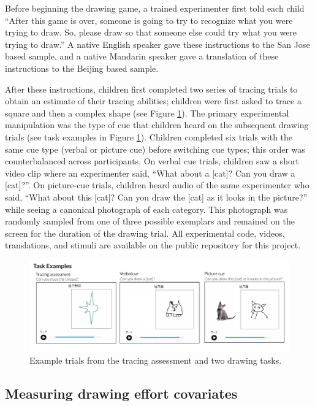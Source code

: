 \documentclass[
  english,
  man]{apa6}
\begin{document}
Before beginning the drawing game, a trained experimenter first told each child \enquote{After this game is over, someone is going to try to recognize what you were trying to draw. So, please draw so that someone else could try what you were trying to draw.} A native English speaker gave these instructions to the San Jose based sample, and a native Mandarin speaker gave a translation of these instructions to the Beijing based sample.

After these instructions, children first completed two series of tracing trials to obtain an estimate of their tracing abilities; children were first asked to trace a square and then a complex shape (see Figure \ref{fig:example-tasks}). The primary experimental manipulation was the type of cue that children heard on the subsequent drawing trials (see task examples in Figure \ref{fig:example-tasks}). Children completed six trials with the same cue type (verbal or picture cue) before switching cue types; this order was counterbalanced across participants. On verbal cue trials, children saw a short video clip where an experimenter said, \enquote{What about a {[}cat{]}? Can you draw a {[}cat{]}?}. On picture-cue trials, children heard audio of the same experimenter who said, \enquote{What about this {[}cat{]}? Can you draw the {[}cat{]} as it looks in the picture?} while seeing a canonical photograph of each category. This photograph was randomly sampled from one of three possible exemplars and remained on the screen for the duration of the drawing trial. All experimental code, videos, translations, and stimuli are available on the public repository for this project.

\begin{figure}[H]
\includegraphics[width=1\linewidth]{figs/task_examples} \caption{Example trials from the tracing assessment and two drawing tasks.}\label{fig:example-tasks}
\end{figure}

\hypertarget{measuring-drawing-effort-covariates}{%
\subsection{Measuring drawing effort covariates}\label{measuring-drawing-effort-covariates}}
\end{document}
